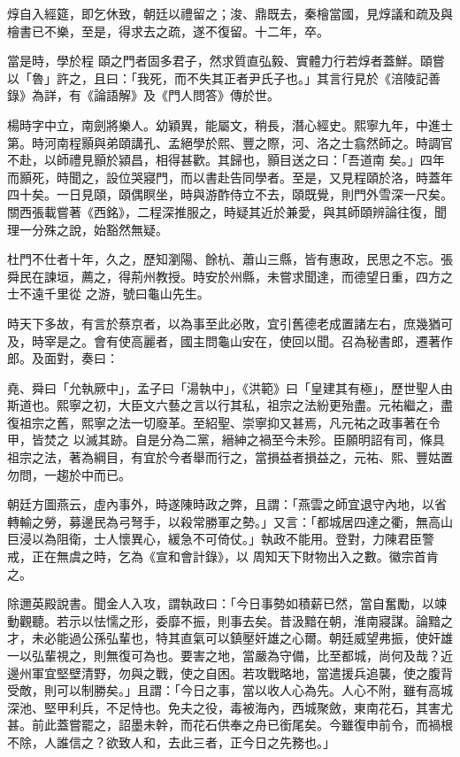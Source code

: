 \begin{pinyinscope}
 焞自入經筵，即乞休致，朝廷以禮留之；浚、鼎既去，秦檜當國，見焞議和疏及與檜書已不樂，至是，得求去之疏，遂不復留。十二年，卒。



 當是時，學於程
 頤之門者固多君子，然求質直弘毅、實體力行若焞者蓋鮮。頤嘗以「魯」許之，且曰：「我死，而不失其正者尹氏子也。」其言行見於《涪陵記善錄》為詳，有《論語解》及《門人問答》傳於世。



 楊時字中立，南劍將樂人。幼穎異，能屬文，稍長，潛心經史。熙寧九年，中進士第。時河南程顥與弟頤講孔、孟絕學於熙、豐之際，河、洛之士翕然師之。時調官不赴，以師禮見顥於潁昌，相得甚歡。其歸也，顥目送之曰：「吾道南
 矣。」四年而顥死，時聞之，設位哭寢門，而以書赴告同學者。至是，又見程頤於洛，時蓋年四十矣。一日見頤，頤偶瞑坐，時與游酢侍立不去，頤既覺，則門外雪深一尺矣。關西張載嘗著《西銘》，二程深推服之，時疑其近於兼愛，與其師頤辨論往復，聞理一分殊之說，始豁然無疑。



 杜門不仕者十年，久之，歷知瀏陽、餘杭、蕭山三縣，皆有惠政，民思之不忘。張舜民在諫垣，薦之，得荊州教授。時安於州縣，未嘗求聞達，而德望日重，四方之士不遠千里從
 之游，號曰龜山先生。



 時天下多故，有言於蔡京者，以為事至此必敗，宜引舊德老成置諸左右，庶幾猶可及，時宰是之。會有使高麗者，國主問龜山安在，使回以聞。召為秘書郎，遷著作郎。及面對，奏曰：



 堯、舜曰「允執厥中」，孟子曰「湯執中」，《洪範》曰「皇建其有極」，歷世聖人由斯道也。熙寧之初，大臣文六藝之言以行其私，祖宗之法紛更殆盡。元祐繼之，盡復祖宗之舊，熙寧之法一切廢革。至紹聖、崇寧抑又甚焉，凡元祐之政事著在令甲，皆焚之
 以滅其跡。自是分為二黨，縉紳之禍至今未殄。臣願明詔有司，條具祖宗之法，著為綱目，有宜於今者舉而行之，當損益者損益之，元祐、熙、豐姑置勿問，一趨於中而已。



 朝廷方圖燕云，虛內事外，時遂陳時政之弊，且謂：「燕雲之師宜退守內地，以省轉輸之勞，募邊民為弓弩手，以殺常勝軍之勢。」又言：「都城居四達之衢，無高山巨浸以為阻衛，士人懷異心，緩急不可倚仗。」執政不能用。登對，力陳君臣警戒，正在無虞之時，乞為《宣和會計錄》，以
 周知天下財物出入之數。徽宗首肯之。



 除邇英殿說書。聞金人入攻，謂執政曰：「今日事勢如積薪已然，當自奮勵，以竦動觀聽。若示以怯懦之形，委靡不振，則事去矣。昔汲黯在朝，淮南寢謀。論黯之才，未必能過公孫弘輩也，特其直氣可以鎮壓奸雄之心爾。朝廷威望弗振，使奸雄一以弘輩視之，則無復可為也。要害之地，當嚴為守備，比至都城，尚何及哉？近邊州軍宜堅壁清野，勿與之戰，使之自困。若攻戰略地，當遣援兵追襲，使之腹背
 受敵，則可以制勝矣。」且謂：「今日之事，當以收人心為先。人心不附，雖有高城深池、堅甲利兵，不足恃也。免夫之役，毒被海內，西城聚斂，東南花石，其害尤甚。前此蓋嘗罷之，詔墨未幹，而花石供奉之舟已銜尾矣。今雖復申前令，而禍根不除，人誰信之？欲致人和，去此三者，正今日之先務也。」




\end{pinyinscope}
